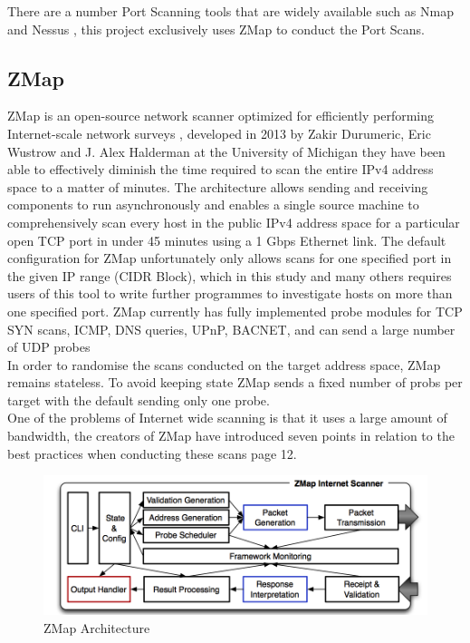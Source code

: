 \documentclass[a4wide,leqno,12pt]{report}
\begin{document}
There are a number Port Scanning tools that are widely available such as Nmap \cite{lyon2009nmap} and Nessus \cite{beale2004nessus}, this project exclusively uses ZMap \cite{durumeric2013zmap} to conduct the Port Scans.
\subsection{ZMap}
ZMap is an open-source network scanner optimized for efficiently performing
Internet-scale network surveys \cite{durumeric2013zmap}, developed in 2013 by Zakir Durumeric, Eric Wustrow and J. Alex Halderman at the University of Michigan they have been able to effectively diminish the time required to scan the entire IPv4 address space to a matter of minutes. The architecture allows sending and receiving components
to run asynchronously and enables a single source machine to comprehensively scan every host in the public IPv4
address space for a particular open TCP port in under 45 minutes using a 1 Gbps Ethernet link\cite{durumeric2013zmap}. The default configuration for ZMap unfortunately only allows scans for one specified port in the given IP range (CIDR Block)\cite{fuller1993classless}, which in this study and many others requires users of this tool to write further programmes to investigate hosts on more than one specified port. ZMap currently has fully implemented probe modules for TCP SYN scans, ICMP, DNS queries, UPnP, BACNET, and can send a large number of UDP probes \cite{zmapGithub}\\


In order to randomise the scans conducted on the target address space, ZMap remains stateless. To avoid keeping state ZMap sends a fixed number of probs per target with the default sending only one probe.\cite{durumeric2013zmap}\\

One of the problems of Internet wide scanning is that it uses a large amount of bandwidth,
the creators of ZMap have introduced seven points in relation to the best practices when conducting these scans\cite{durumeric2013zmap} page 12. \\


\begin{figure}[H]
\centering
\includegraphics[scale=.4]{images/zmap_architecture.png}
\caption{ZMap Architecture}
\end{figure}
\end{document}
